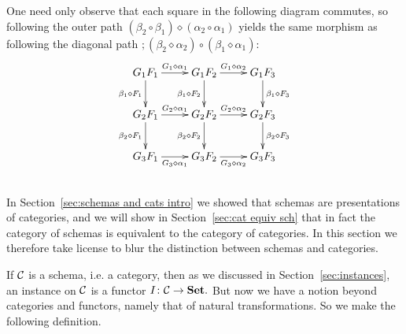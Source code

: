 \documentclass[CT4S-EN-RU]{subfiles}
\begin{document}
\begin{theoremRUS}
\end{theoremRUS}

\begin{proofENG}
One need only observe that each square in the following diagram commutes, so following the outer path $(\beta_2\circ\beta_1)\diamond(\alpha_2\circ\alpha_1)$ yields the same morphism as following the diagonal path $;(\beta_2\diamond\alpha_2)\circ(\beta_1\diamond\alpha_1)$:
$$
\xymatrix{
G_1F_1\ar[r]^{G_1\diamond\alpha_1}\ar[d]_{\beta_1\diamond F_1}&G_1F_2\ar[r]^{G_1\diamond\alpha_2}\ar[d]_{\beta_1\diamond F_2}&G_1F_3\ar[d]^{\beta_1\diamond F_3}\\
G_2F_1\ar[r]^{G_2\diamond\alpha_1}\ar[d]_{\beta_2\diamond F_1}&G_2F_2\ar[r]^{G_2\diamond\alpha_2}\ar[d]_{\beta_2\diamond F_2}&G_2F_3\ar[d]^{\beta_2\diamond F_3}\\
G_3F_1\ar[r]_{G_3\diamond\alpha_1}&G_3F_2\ar[r]_{G_3\diamond\alpha_2}&G_3F_3
}
$$
\end{proofENG}

\begin{proofRUS}
\end{proofRUS}


\subsection{}

\begin{blockENG}
In Section~\ref{sec:schemas and cats intro} we showed that schemas are presentations of categories, and we will show in Section~\ref{sec:cat equiv sch} that in fact the category of schemas is equivalent to the category of categories. In this section we therefore take license to blur the distinction between schemas and categories.
\end{blockENG}

\begin{blockRUS}
\end{blockRUS}

\begin{blockENG}
If $\mathcal{C}$ is a schema, i.e. a category, then as we discussed in Section~\ref{sec:instances}, an instance on $\mathcal{C}$ is a functor $I\colon\mathcal{C}\rightarrow{\mathbf{Set}}.$ But now we have a notion beyond categories and functors, namely that of natural transformations. So we make the following definition.
\end{blockENG}
\end{document}
